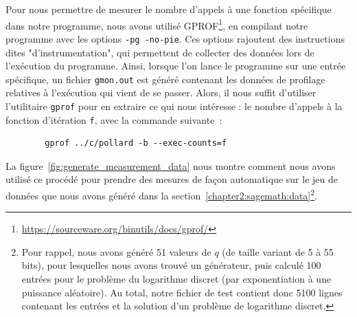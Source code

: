       Pour nous permettre de mesurer le nombre d'appels à une fonction spécifique dans notre programme, nous avons utilisé GPROF\footnote{\url{https://sourceware.org/binutils/docs/gprof/}}, en compilant notre programme avec les options \lstinline{-pg -no-pie}. Ces options rajoutent des instructions dites "d'instrumentation", qui permettent de collecter des données lors de l'exécution du programme.
      Ainsi, lorsque l'on lance le programme sur une entrée spécifique, un fichier \lstinline{gmon.out} est généré contenant les données de profilage relatives à l'exécution qui vient de se passer. Alors, il nous suffit d'utiliser l'utilitaire \lstinline{gprof} pour en extraire ce qui nous intéresse : le nombre d'appels à la fonction d'itération \lstinline{f}, avec la commande suivante~:

      \begin{lstlisting}
        gprof ../c/pollard -b --exec-counts=f
      \end{lstlisting}

      La figure~\ref{fig:generate_measurement_data} nous montre comment nous avons utilisé ce procédé pour prendre des mesures de façon automatique sur le jeu de données que nous avons généré dans la section~\ref{chapter2:sagemath:data}\footnote{Pour rappel, nous avons généré 51 valeurs de $q$ (de taille variant de 5 à 55 bits), pour lesquelles nous avons trouvé un générateur, puis calculé 100 entrées pour le problème du logarithme discret (par exponentiation à une puissance aléatoire). Au total, notre fichier de test contient donc 5100 lignes contenant les entrées et la solution d'un problème de logarithme discret.}.

